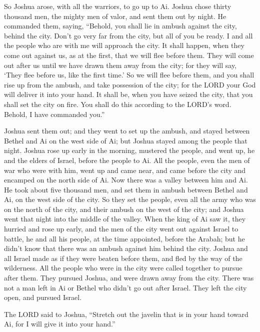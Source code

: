 \myverse{}So Joshua arose, with all the warriors, to go up to Ai. Joshua
chose thirty thousand men, the mighty men of valor, and sent them out by night.
\myverse{}He commanded them, saying, “Behold, you shall lie in ambush against the city,
behind the city. Don’t go very far from the city, but all of you be ready.
\myverse{}I and all the people who are with me will approach the city. It shall happen,
when they come out against us, as at the first, that we will flee before them.
\myverse{}They will come out after us until we have drawn them away from the city; for
they will say, ‘They flee before us, like the first time.’ So we will flee before them,
\myverse{}and you shall rise up from the ambush, and take possession of the city; for
the LORD your God will deliver it into your hand.
\myverse{}It shall be, when you have seized the city, that you shall set the city on fire.
You shall do this according to the LORD’s word. Behold, I have commanded you.”

\myverse{}Joshua sent them out; and they went to set up the ambush, and stayed
between Bethel and Ai on the west side of Ai; but Joshua stayed among the people that night.
\myverse{}Joshua rose up early in the morning, mustered the people, and went up, he
and the elders of Israel, before the people to Ai.
\myverse{}All the people, even the men of war who were with him, went up and came near,
and came before the city and encamped on the north side of Ai. Now there was a valley between him and
Ai.
\myverse{}He took about five thousand men, and set them in ambush between Bethel and
Ai, on the west side of the city.
\myverse{}So they set the people, even all the army who was on the north of the city,
and their ambush on the west of the city; and Joshua went that night into the middle of the valley.
\myverse{}When the king of Ai saw it, they hurried and rose up early, and the men of
the city went out against Israel to battle, he and all his people, at the time appointed, before the Arabah;
but he didn’t know that there was an ambush against him behind the city.
\myverse{}Joshua and all Israel made as if they were beaten before them, and fled by
the way of the wilderness.
\myverse{}All the people who were in the city were called together to pursue after them.
They pursued Joshua, and were drawn away from the city.
\myverse{}There was not a man left in Ai or Bethel who didn’t go out after Israel. They
left the city open, and pursued Israel.

\myverse{}The LORD said to Joshua, “Stretch out the javelin that is in
your hand toward Ai, for I will give it into your hand.”

